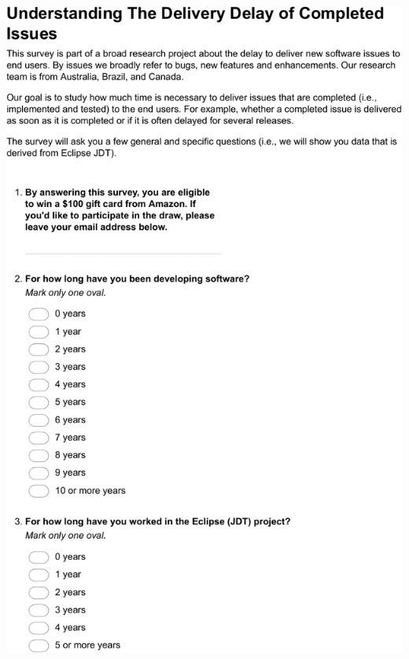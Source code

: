 \documentclass[
	12pt,				%
	openright,			%
	oneside,			%
	a4paper,			%
	french,				%
	spanish,			%
	brazil,				%
	english
	]{abntex2}
\newcounter{pt}
\newcounter{th}
\begin{document}
\begin{apendicesenv}
\includegraphics[width=.8\textwidth,keepaspectratio]{chapters/chapter5/appendix/Eclipse1.pdf}


\end{apendicesenv}
\end{document}
